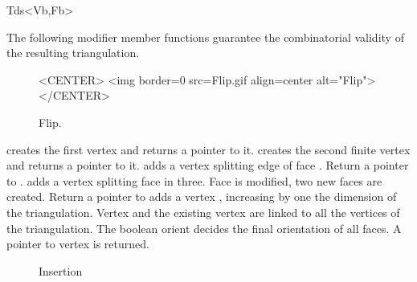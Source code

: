 \begin{ccClassTemplate}{Tds<Vb,Fb>}
\ccGlue
{}


The following modifier member functions  guarantee
the combinatorial validity of the resulting triangulation.



\begin{figure}
\begin{ccTexOnly}
\begin{center} %

\end{center}
\end{ccTexOnly} 
\caption{Flip.
\label{I1_fig_flip}}

\begin{ccHtmlOnly}
<CENTER>
<img border=0 src=Flip.gif align=center alt="Flip">
</CENTER>
\end{ccHtmlOnly} 
\end{figure}


 {creates the first 
vertex and returns a pointer to it.}
\ccGlue
{} {creates the second finite
vertex and returns a pointer to it.}
 {adds a
vertex  splitting 
edge  of face . Return a  pointer to .}
\ccGlue
{} {adds a vertex
 splitting  face
 in three. Face  is modified,
two new faces are created. Return a  pointer to  }
\ccGlue
{} {adds
a vertex , increasing by one the dimension of the triangulation.
Vertex  and the existing vertex  are linked to all 
the vertices of the triangulation. 
The boolean orient decides the final orientation of all 
faces. A pointer to vertex  is returned.
}

\begin{figure}
\begin{ccTexOnly}
\begin{center}  \end{center}
\caption{Insertion}
\end{ccTexOnly} 


\end{figure}
\end{ccClassTemplate}
